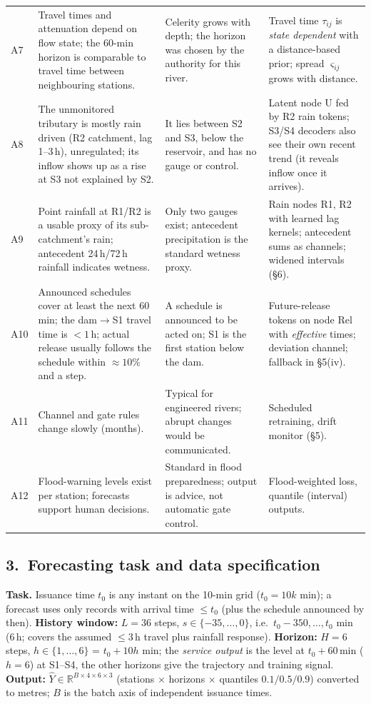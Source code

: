 \begin{table}[H]
\begin{tabularx}{\linewidth}{@{}l>{\raggedright\arraybackslash}p{4.6cm}>{\raggedright\arraybackslash}X>{\raggedright\arraybackslash}X@{}}
A7 & Travel times and attenuation depend on flow state; the 60-min horizon is comparable to travel time between neighbouring stations.& Celerity grows with depth; the horizon was chosen by the authority for this river.& Travel time $\tau_{ij}$ is \emph{state dependent} with a distance-based prior; spread $\varsigma_{ij}$ grows with distance.\\
A8 & The unmonitored tributary is mostly rain driven (R2 catchment, lag 1--3\,h), unregulated; its inflow shows up as a rise at S3 not explained by S2.& It lies between S2 and S3, below the reservoir, and has no gauge or control.& Latent node U fed by R2 rain tokens; S3/S4 decoders also see their own recent trend (it reveals inflow once it arrives).\\
A9 & Point rainfall at R1/R2 is a usable proxy of its sub-catchment's rain; antecedent 24\,h/72\,h rainfall indicates wetness.& Only two gauges exist; antecedent precipitation is the standard wetness proxy.& Rain nodes R1, R2 with learned lag kernels; antecedent sums as channels; widened intervals (\S6).\\
A10 & Announced schedules cover at least the next 60\,min; the dam$\to$S1 travel time is $<1$\,h; actual release usually follows the schedule within $\approx10\%$ and a step.& A schedule is announced to be acted on; S1 is the first station below the dam.& Future-release tokens on node Rel with \emph{effective} times; deviation channel; fallback in \S5(iv).\\
A11 & Channel and gate rules change slowly (months).& Typical for engineered rivers; abrupt changes would be communicated.& Scheduled retraining, drift monitor (\S5).\\
A12 & Flood-warning levels exist per station; forecasts support human decisions.& Standard in flood preparedness; output is advice, not automatic gate control.& Flood-weighted loss, quantile (interval) outputs.\\ \bottomrule
\end{tabularx}
\end{table}

\subsection*{3.\ Forecasting task and data specification}
\noindent\textbf{Task.} Issuance time $t_0$ is any instant on the 10-min grid ($t_0=10k$ min); a forecast uses only records with arrival time $\le t_0$ (plus the schedule announced by then). \textbf{History window:} $L{=}36$ steps, $s\in\{-35,\dots,0\}$, i.e.\ $t_0-350,\dots,t_0$ min (6\,h; covers the assumed $\le3$\,h travel plus rainfall response). \textbf{Horizon:} $H{=}6$ steps, $h\in\{1,\dots,6\}$ = $t_0{+}10h$ min; the \emph{service output} is the level at $t_0{+}60$\,min ($h{=}6$) at S1--S4, the other horizons give the trajectory and training signal. \textbf{Output:} $\hat Y\in\mathbb{R}^{B\times4\times6\times3}$ (stations $\times$ horizons $\times$ quantiles $0.1/0.5/0.9$) converted to metres; $B$ is the batch axis of independent issuance times.

